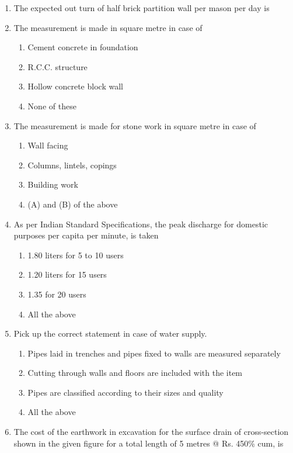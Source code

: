 \documentclass[11pt,a4paper]{article}
\begin{document}
\begin{enumerate}
\item{The expected out turn of half brick partition wall per mason per day is}
\\
\item{The measurement is made in square metre in case of}
\begin{enumerate}[label=\Alph*.]
\item{Cement concrete in foundation}
\item{R.C.C. structure}
\item{Hollow concrete block wall}
\item{None of these}
\end{enumerate}
\item{The measurement is made for stone work in square metre in case of}
\begin{enumerate}[label=\Alph*.]
\item{Wall facing}
\item{Columns, lintels, copings}
\item{Building work}
\item{(A) and (B) of the above}
\end{enumerate}
\item{As per Indian Standard Specifications, the peak discharge for domestic purposes per capita per minute, is taken}
\begin{enumerate}[label=\Alph*.]
\item{1.80 liters for 5 to 10 users}
\item{1.20 liters for 15 users}
\item{1.35 for 20 users}
\item{All the above}
\end{enumerate}
\item{Pick up the correct statement in case of water supply.}
\begin{enumerate}[label=\Alph*.]
\item{Pipes laid in trenches and pipes fixed to walls are measured separately}
\item{Cutting through walls and floors are included with the item}
\item{Pipes are classified according to their sizes and quality}
\item{All the above}
\end{enumerate}
\item{The cost of the earthwork in excavation for the surface drain of cross-section shown in the given figure for a total length of 5 metres @ Rs. 450\% cum, is \\

}
\end{enumerate}
\end{document}
